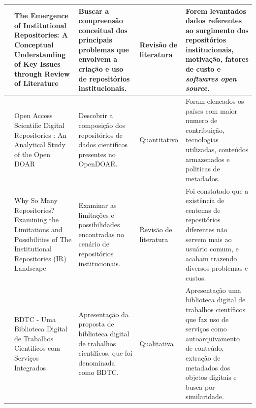 \begin{landscape}
\begin{table}[H]
{\begin{tabular}{|p{3cm}|p{8cm}|p{8cm}|p{4cm}|p{8cm}|}
                \cite{2018:Saini}            & The Emergence of Institutional Repositories: A Conceptual Understanding of Key Issues through Review of Literature                        & Buscar a compreensão conceitual dos principais problemas que envolvem a criação e uso de repositórios institucionais.                   & Revisão de literatura          & Forem levantados dados referentes ao surgimento dos repositórios institucionais, motivação, fatores de custo e \emph{softwares open source}.                                                 \\ \hline
                \cite{2018:Mufazil}          & Open Access Scientific Digital Repositories : An Analytical Study of the Open DOAR                                                        & Descobrir a composição dos repositórios de dados científicos presentes no OpenDOAR.                                                     & Quantitativo                   & Foram elencados os países com maior numero de contribuição, tecnologias utilizadas, conteúdos armazenados e politicas de metadados.                                                          \\ \hline
                \cite{2018:Arlitsch}         & Why So Many Repositories? Examining the Limitations and Possibilities of The Institutional Repositories (IR) Landscape                    & Examinar as limitações e possibilidades encontradas no cenário de repositórios institucionais.                                          & Revisão de literatura          & Foi constatado que a existência de centenas de repositórios diferentes não servem mais ao usuário comum, e acabam trazendo diversos problemas e custos.                                      \\ \hline
                \cite{2009:Cervi}            & BDTC - Uma Biblioteca Digital de Trabalhos Científicos com Serviços Integrados                                                            & Apresentação da proposta de biblioteca digital de trabalhos científicos, que foi denominada como BDTC.                                  & Qualitativa                    & Apresentação uma biblioteca digital de trabalhos científicos que faz uso de serviços como autoarquivamento de conteúdo, extração de metadados dos objetos digitais e busca por similaridade. \\ \hline
            \end{tabular}%
        }
    \end{table}
\end{landscape}
